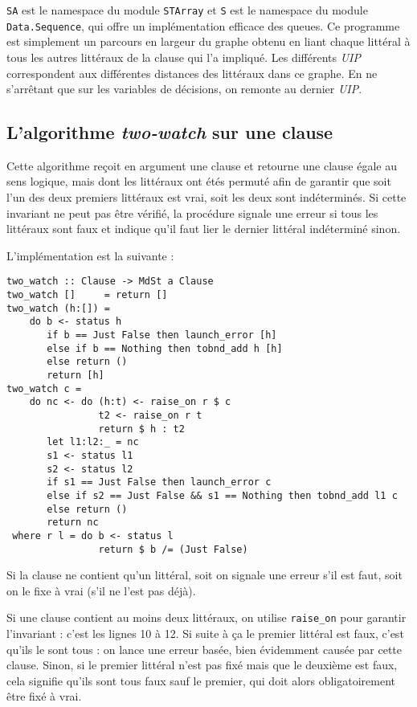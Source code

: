 \texttt{SA} est le namespace du module \texttt{STArray} et \texttt{S} est le
namespace du module \texttt{Data.Sequence}, qui offre un implémentation
efficace des queues. Ce programme est simplement un parcours en largeur du
graphe obtenu en liant chaque littéral à tous les autres littéraux de la clause
qui l'a impliqué. Les différents \emph{UIP} correspondent aux différentes
distances des littéraux dans ce graphe. En ne s'arrêtant que sur les variables
de décisions, on remonte au dernier \emph{UIP}.


\subsection{L'algorithme \emph{two-watch} sur une clause}
Cette algorithme reçoit en argument une clause et retourne une clause égale au
sens logique, mais dont les littéraux ont étés permuté afin de garantir que
soit l'un des deux premiers littéraux est vrai, soit les deux sont
indéterminés. Si cette invariant ne peut pas être vérifié, la procédure signale
une erreur si tous les littéraux sont faux et indique qu'il faut lier le
dernier littéral indéterminé sinon.

L'implémentation est la suivante :
\begin{lstlisting}
two_watch :: Clause -> MdSt a Clause
two_watch []     = return []
two_watch (h:[]) =
    do b <- status h
       if b == Just False then launch_error [h]
       else if b == Nothing then tobnd_add h [h]
       else return ()
       return [h]
two_watch c =
    do nc <- do (h:t) <- raise_on r $ c
                t2 <- raise_on r t
                return $ h : t2
       let l1:l2:_ = nc
       s1 <- status l1
       s2 <- status l2
       if s1 == Just False then launch_error c
       else if s2 == Just False && s1 == Nothing then tobnd_add l1 c
       else return ()
       return nc
 where r l = do b <- status l
                return $ b /= (Just False)
\end{lstlisting}%

Si la clause ne contient qu'un littéral, soit on signale une erreur s'il est
faut, soit on le fixe à vrai (s'il ne l'est pas déjà).

Si une clause contient au moins deux littéraux, on utilise \texttt{raise\_on}
pour garantir l'invariant : c'est les lignes 10 à 12. Si suite à ça le premier
littéral est faux, c'est qu'ils le sont tous : on lance une erreur basée, bien
évidemment causée par cette clause. Sinon, si le premier littéral n'est pas
fixé mais que le deuxième est faux, cela signifie qu'ils sont tous faux sauf
le premier, qui doit alors obligatoirement être fixé à vrai.


